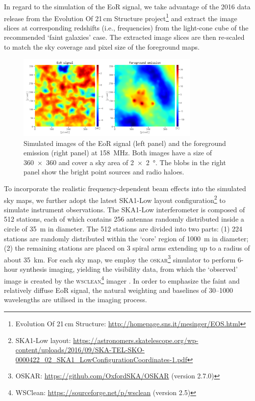 \documentclass[fleqn,usenatbib]{mnras}
\newcommand{\editone}[1]{{\leavevmode\color{cyan}#1}}
\begin{document}
{In regard to the simulation of the EoR signal, we take advantage of the
2016 data release from the Evolution Of 21\,cm Structure project\footnote{%
  Evolution Of 21\,cm Structure:
  \url{http://homepage.sns.it/mesinger/EOS.html}}
\citep{mesinger2016} and extract the image slices at corresponding
redshifts (i.e., frequencies) from the light-cone cube of the recommended
`faint galaxies' case.
The extracted image slices are then re-scaled to match the sky coverage and
pixel size of the foreground maps.

\begin{figure}
  \centering
  \includegraphics[width=0.8\textwidth]{obsimg-158}
  \caption{\label{fig:obsimg}\editone{%
    Simulated images of the EoR signal (left panel) and the foreground
    emission (right panel) at \SI{158}{\MHz}.
    Both images have a size of \num{360 x 360} and cover a sky area of
    \SI{2 x 2}{\degree}.
    The blobs in the right panel show the bright point sources and radio
    haloes.
  }}
\end{figure}

To incorporate the realistic frequency-dependent beam effects into the
simulated sky maps, we further adopt the latest SKA1-Low layout
configuration\footnote{\raggedright%
  SKA1-Low layout:
  \url{https://astronomers.skatelescope.org/wp-content/uploads/2016/09/SKA-TEL-SKO-0000422_02_SKA1_LowConfigurationCoordinates-1.pdf}}
to simulate instrument observations.
The SKA1-Low interferometer is composed of 512 stations, each of which
contains 256 antennas randomly distributed inside a circle of
\SI{35}{\meter} in diameter.
The 512 stations are divided into two parts:
(1) 224 stations are randomly distributed within the `core' region of
\SI{1000}{\meter} in diameter;
(2) the remaining stations are placed on 3 spiral arms extending up to a
radius of about \SI{35}{\kilo\meter}.
For each sky map, we employ the \textsc{oskar}\footnote{%
  OSKAR: \url{https://github.com/OxfordSKA/OSKAR} (version 2.7.0)}
simulator \citep{mort2010} to perform 6-hour synthesis imaging,
yielding the visibility data, from which the `observed'
image is created by the \textsc{wsclean}\footnote{%
  WSClean: \url{https://sourceforge.net/p/wsclean} (version 2.5)}
imager \citep{offringa2014}.
In order to emphasize the faint and relatively diffuse EoR signal, the
natural weighting and baselines of \numrange{30}{1000} wavelengths are
utilised in the imaging process.} %
\end{document}
